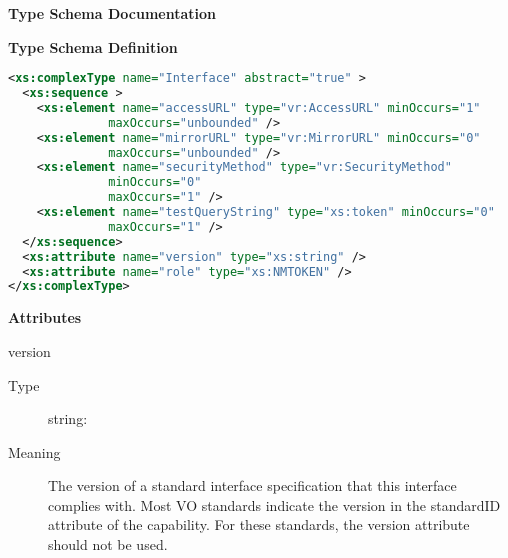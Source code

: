 \documentclass[11pt,a4paper]{ivoa}
\begin{document}
\begin{generated}
\begingroup
        \renewcommand*\descriptionlabel[1]{%
        \hbox to 5.5em{\emph{#1}\hfil}}\vspace{2ex}\noindent\textbf{ Type Schema Documentation}




\vspace{1ex}\noindent\textbf{ Type Schema Definition}

\begin{lstlisting}[language=XML,basicstyle=\footnotesize]
<xs:complexType name="Interface" abstract="true" >
  <xs:sequence >
    <xs:element name="accessURL" type="vr:AccessURL" minOccurs="1"
              maxOccurs="unbounded" />
    <xs:element name="mirrorURL" type="vr:MirrorURL" minOccurs="0"
              maxOccurs="unbounded" />
    <xs:element name="securityMethod" type="vr:SecurityMethod"
              minOccurs="0"
              maxOccurs="1" />
    <xs:element name="testQueryString" type="xs:token" minOccurs="0"
              maxOccurs="1" />
  </xs:sequence>
  <xs:attribute name="version" type="xs:string" />
  <xs:attribute name="role" type="xs:NMTOKEN" />
</xs:complexType>
\end{lstlisting}

\vspace{0.5ex}\noindent\textbf{ Attributes}

\begingroup\small\begin{bigdescription}
\item[version]
\begin{description}
\item[Type] string: 
\item[Meaning]
               The version of a standard interface specification that this
               interface complies with.  Most VO standards indicate the
               version in the standardID attribute of the capability.  For
               these standards, the version attribute should not be used.


\end{description}
\end{bigdescription}
\end{generated}
\end{document}
